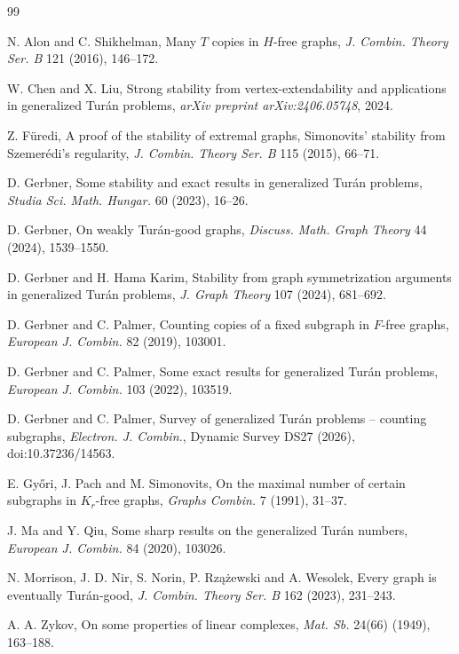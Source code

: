 \documentclass[11pt]{article}
\numberwithin{equation}{section}
\theoremstyle{definition}
\theoremstyle{remark}
\begin{document}
\begin{thebibliography}{99}

N. Alon and C. Shikhelman,
Many $T$ copies in $H$-free graphs,
\emph{J. Combin. Theory Ser. B} 121 (2016), 146--172.

W. Chen and X. Liu,
Strong stability from vertex-extendability and applications in generalized Tur\'an problems,
\emph{arXiv preprint arXiv:2406.05748}, 2024.

Z. F\"uredi,
A proof of the stability of extremal graphs, Simonovits' stability from Szemer\'edi's regularity,
\emph{J. Combin. Theory Ser. B} 115 (2015), 66--71.

D. Gerbner,
Some stability and exact results in generalized Tur\'an problems,
\emph{Studia Sci. Math. Hungar.} 60 (2023), 16--26.

D. Gerbner,
On weakly Tur\'an-good graphs,
\emph{Discuss. Math. Graph Theory} 44 (2024), 1539--1550.

D. Gerbner and H. Hama Karim,
Stability from graph symmetrization arguments in generalized Tur\'an problems,
\emph{J. Graph Theory} 107 (2024), 681--692.

D. Gerbner and C. Palmer,
Counting copies of a fixed subgraph in $F$-free graphs,
\emph{European J. Combin.} 82 (2019), 103001.

D. Gerbner and C. Palmer,
Some exact results for generalized Tur\'an problems,
\emph{European J. Combin.} 103 (2022), 103519.

D. Gerbner and C. Palmer,
Survey of generalized Tur\'an problems -- counting subgraphs,
\emph{Electron. J. Combin.}, Dynamic Survey DS27 (2026), doi:10.37236/14563.

E. Gy\H{o}ri, J. Pach and M. Simonovits,
On the maximal number of certain subgraphs in $K_r$-free graphs,
\emph{Graphs Combin.} 7 (1991), 31--37.

J. Ma and Y. Qiu,
Some sharp results on the generalized Tur\'an numbers,
\emph{European J. Combin.} 84 (2020), 103026.

N. Morrison, J. D. Nir, S. Norin, P. Rz\k{a}\.zewski and A. Wesolek,
Every graph is eventually Tur\'an-good,
\emph{J. Combin. Theory Ser. B} 162 (2023), 231--243.

A. A. Zykov,
On some properties of linear complexes,
\emph{Mat. Sb.} 24(66) (1949), 163--188.

\end{thebibliography}
\end{document}
